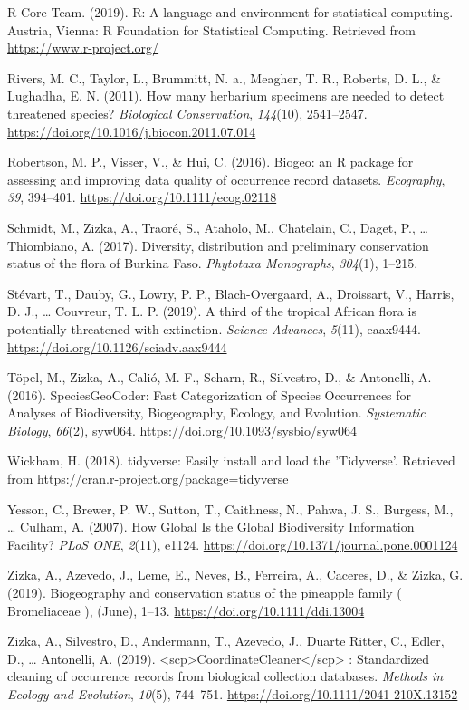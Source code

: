 \documentclass[
  12pt,
]{article}
\begin{document}
\leavevmode\hypertarget{ref-rcoreteam2019}{}%
R Core Team. (2019). R: A language and environment for statistical computing. Austria, Vienna: R Foundation for Statistical Computing. Retrieved from \url{https://www.r-project.org/}

\leavevmode\hypertarget{ref-Rivers2011}{}%
Rivers, M. C., Taylor, L., Brummitt, N. a., Meagher, T. R., Roberts, D. L., \& Lughadha, E. N. (2011). How many herbarium specimens are needed to detect threatened species? \emph{Biological Conservation}, \emph{144}(10), 2541--2547. \url{https://doi.org/10.1016/j.biocon.2011.07.014}

\leavevmode\hypertarget{ref-Robertson2016}{}%
Robertson, M. P., Visser, V., \& Hui, C. (2016). Biogeo: an R package for assessing and improving data quality of occurrence record datasets. \emph{Ecography}, \emph{39}, 394--401. \url{https://doi.org/10.1111/ecog.02118}

\leavevmode\hypertarget{ref-Schmidt2017}{}%
Schmidt, M., Zizka, A., Traoré, S., Ataholo, M., Chatelain, C., Daget, P., \ldots{} Thiombiano, A. (2017). Diversity, distribution and preliminary conservation status of the flora of Burkina Faso. \emph{Phytotaxa Monographs}, \emph{304}(1), 1--215.

\leavevmode\hypertarget{ref-Stevart2019}{}%
Stévart, T., Dauby, G., Lowry, P. P., Blach-Overgaard, A., Droissart, V., Harris, D. J., \ldots{} Couvreur, T. L. P. (2019). A third of the tropical African flora is potentially threatened with extinction. \emph{Science Advances}, \emph{5}(11), eaax9444. \url{https://doi.org/10.1126/sciadv.aax9444}

\leavevmode\hypertarget{ref-Topel2016}{}%
Töpel, M., Zizka, A., Calió, M. F., Scharn, R., Silvestro, D., \& Antonelli, A. (2016). SpeciesGeoCoder: Fast Categorization of Species Occurrences for Analyses of Biodiversity, Biogeography, Ecology, and Evolution. \emph{Systematic Biology}, \emph{66}(2), syw064. \url{https://doi.org/10.1093/sysbio/syw064}

\leavevmode\hypertarget{ref-Wickham2018}{}%
Wickham, H. (2018). tidyverse: Easily install and load the 'Tidyverse'. Retrieved from \url{https://cran.r-project.org/package=tidyverse}

\leavevmode\hypertarget{ref-Yesson2007}{}%
Yesson, C., Brewer, P. W., Sutton, T., Caithness, N., Pahwa, J. S., Burgess, M., \ldots{} Culham, A. (2007). How Global Is the Global Biodiversity Information Facility? \emph{PLoS ONE}, \emph{2}(11), e1124. \url{https://doi.org/10.1371/journal.pone.0001124}

\leavevmode\hypertarget{ref-Zizka2019a}{}%
Zizka, A., Azevedo, J., Leme, E., Neves, B., Ferreira, A., Caceres, D., \& Zizka, G. (2019). Biogeography and conservation status of the pineapple family ( Bromeliaceae ), (June), 1--13. \url{https://doi.org/10.1111/ddi.13004}

\leavevmode\hypertarget{ref-Zizka2019}{}%
Zizka, A., Silvestro, D., Andermann, T., Azevedo, J., Duarte Ritter, C., Edler, D., \ldots{} Antonelli, A. (2019). \textless{}scp\textgreater{}CoordinateCleaner\textless{}/scp\textgreater{} : Standardized cleaning of occurrence records from biological collection databases. \emph{Methods in Ecology and Evolution}, \emph{10}(5), 744--751. \url{https://doi.org/10.1111/2041-210X.13152}
\end{document}
